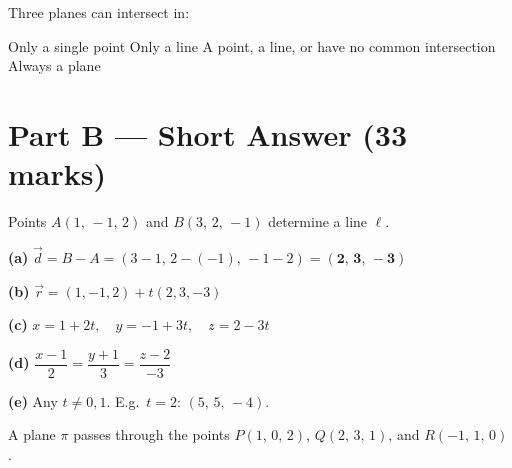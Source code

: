 \documentclass[addpoints]{exam}
\begin{document}
\begin{questions}
\question[1] Three planes can intersect in:
\begin{choices}
    \choice Only a single point
    \choice Only a line
    \correctchoice A point, a line, or have no common intersection
    \choice Always a plane
\end{choices}


\section*{Part B --- Short Answer (33 marks)}

\question Points $A(1,\,-1,\,2)$ and $B(3,\,2,\,-1)$ determine a line $\ell$.
\begin{solution}[8cm]
\textbf{(a)} $\vec{d} = B - A = (3-1,\,2-(-1),\,-1-2) = \mathbf{(2,\,3,\,-3)}$

\textbf{(b)} $\vec{r} = (1,-1,2) + t(2,3,-3)$

\textbf{(c)} $x = 1+2t,\quad y = -1+3t,\quad z = 2-3t$

\textbf{(d)} $\dfrac{x-1}{2} = \dfrac{y+1}{3} = \dfrac{z-2}{-3}$

\textbf{(e)} Any $t \neq 0, 1$. E.g.\ $t = 2$: $(5,\,5,\,-4)$.
\end{solution}

\question A plane $\pi$ passes through the points $P(1,\,0,\,2)$, $Q(2,\,3,\,1)$,
and $R(-1,\,1,\,0)$.
\begin{parts}

\end{parts}
\end{questions}
\end{document}

